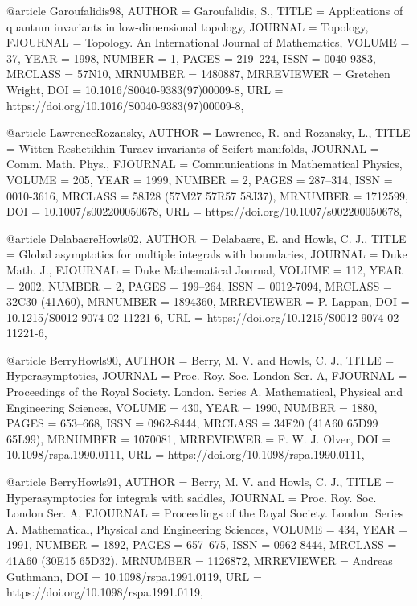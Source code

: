 @article {Garoufalidis98,
    AUTHOR = {Garoufalidis, S.},
     TITLE = {Applications of quantum invariants in low-dimensional
              topology},
   JOURNAL = {Topology},
  FJOURNAL = {Topology. An International Journal of Mathematics},
    VOLUME = {37},
      YEAR = {1998},
    NUMBER = {1},
     PAGES = {219--224},
      ISSN = {0040-9383},
   MRCLASS = {57N10},
  MRNUMBER = {1480887},
MRREVIEWER = {Gretchen Wright},
       DOI = {10.1016/S0040-9383(97)00009-8},
       URL = {https://doi.org/10.1016/S0040-9383(97)00009-8},
}

@article {LawrenceRozansky,
    AUTHOR = {Lawrence, R. and Rozansky, L.},
     TITLE = {Witten-{R}eshetikhin-{T}uraev invariants of {S}eifert
              manifolds},
   JOURNAL = {Comm. Math. Phys.},
  FJOURNAL = {Communications in Mathematical Physics},
    VOLUME = {205},
      YEAR = {1999},
    NUMBER = {2},
     PAGES = {287--314},
      ISSN = {0010-3616},
   MRCLASS = {58J28 (57M27 57R57 58J37)},
  MRNUMBER = {1712599},
       DOI = {10.1007/s002200050678},
       URL = {https://doi.org/10.1007/s002200050678},
}

@article {DelabaereHowls02,
    AUTHOR = {Delabaere, E. and Howls, C. J.},
     TITLE = {Global asymptotics for multiple integrals with boundaries},
   JOURNAL = {Duke Math. J.},
  FJOURNAL = {Duke Mathematical Journal},
    VOLUME = {112},
      YEAR = {2002},
    NUMBER = {2},
     PAGES = {199--264},
      ISSN = {0012-7094},
   MRCLASS = {32C30 (41A60)},
  MRNUMBER = {1894360},
MRREVIEWER = {P. Lappan},
       DOI = {10.1215/S0012-9074-02-11221-6},
       URL = {https://doi.org/10.1215/S0012-9074-02-11221-6},
}

@article {BerryHowls90,
    AUTHOR = {Berry, M. V. and Howls, C. J.},
     TITLE = {Hyperasymptotics},
   JOURNAL = {Proc. Roy. Soc. London Ser. A},
  FJOURNAL = {Proceedings of the Royal Society. London. Series A.
              Mathematical, Physical and Engineering Sciences},
    VOLUME = {430},
      YEAR = {1990},
    NUMBER = {1880},
     PAGES = {653--668},
      ISSN = {0962-8444},
   MRCLASS = {34E20 (41A60 65D99 65L99)},
  MRNUMBER = {1070081},
MRREVIEWER = {F. W. J. Olver},
       DOI = {10.1098/rspa.1990.0111},
       URL = {https://doi.org/10.1098/rspa.1990.0111},
}

@article {BerryHowls91,
    AUTHOR = {Berry, M. V. and Howls, C. J.},
     TITLE = {Hyperasymptotics for integrals with saddles},
   JOURNAL = {Proc. Roy. Soc. London Ser. A},
  FJOURNAL = {Proceedings of the Royal Society. London. Series A.
              Mathematical, Physical and Engineering Sciences},
    VOLUME = {434},
      YEAR = {1991},
    NUMBER = {1892},
     PAGES = {657--675},
      ISSN = {0962-8444},
   MRCLASS = {41A60 (30E15 65D32)},
  MRNUMBER = {1126872},
MRREVIEWER = {Andreas Guthmann},
       DOI = {10.1098/rspa.1991.0119},
       URL = {https://doi.org/10.1098/rspa.1991.0119},
}

